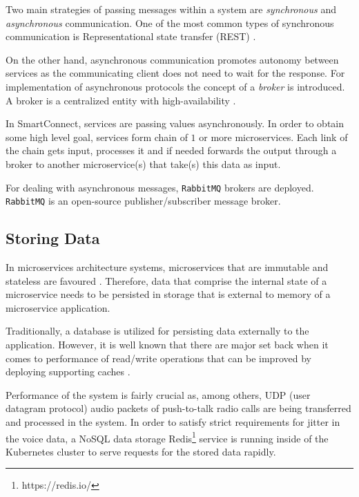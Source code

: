 Two main strategies of passing messages within a system are \textit{synchronous} and \textit{asynchronous} communication. One of the most common types of synchronous communication is Representational state transfer (REST) \cite{indrasiri2018microservices}.

On the other hand, asynchronous communication promotes autonomy between services as the communicating client does not need to wait for the response. 
For implementation of asynchronous protocols the concept of a \textit{broker} is introduced. A broker is a centralized entity with high-availability \cite{indrasiri2018microservices}.

In SmartConnect, services are passing values asynchronously. In order to obtain some high level goal, services form chain of $1$ or more microservices. Each link of the chain gets input, processes it and if needed forwards the output through a broker to another microservice(s) that take(s) this data as input.

For dealing with asynchronous messages, \texttt{RabbitMQ} brokers are deployed. 
\texttt{RabbitMQ} is an open-source publisher/subscriber message broker.



\subsection{Storing Data}
\label{architecture:caching}
In microservices architecture systems, microservices that are immutable and stateless are favoured \cite{indrasiri2018microservices}. 
Therefore, data that comprise the internal state of a microservice needs to be persisted in storage that is external to memory of a microservice application.

Traditionally, a database is utilized for persisting data externally to the application. However, it is well known that there are major set back when it comes to performance of read/write operations that can be improved by deploying supporting caches \cite{elhardt1984database}.

Performance of the system is fairly crucial as, among others, UDP (user datagram protocol) audio packets of push-to-talk radio calls are being transferred and processed in the system. 
In order to satisfy strict requirements for jitter in the voice data, a NoSQL data storage Redis\footnote{https://redis.io/} service is running inside of the Kubernetes cluster to serve requests for the stored data rapidly.
